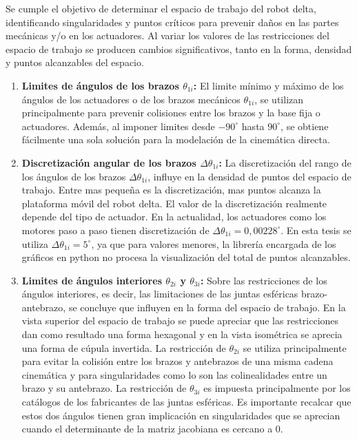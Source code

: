 \begin{itemize}
{            Se cumple el objetivo de determinar el espacio de trabajo del robot delta, identificando singularidades y puntos críticos  para prevenir daños en las partes mecánicas y/o en los actuadores. Al variar los valores de las restricciones del espacio de trabajo se producen cambios significativos, tanto en la forma, densidad y puntos alcanzables del espacio.
                \begin{enumerate}
                    \item  {\textbf{Limites de ángulos de los brazos  $\theta_{1i}$:  }El limite mínimo y máximo de los ángulos de los actuadores o de los brazos mecánicos $\theta_{1i}$, se utilizan principalmente para prevenir colisiones entre los brazos y la base fija o actuadores. Además, al imponer limites desde ${-90}^\circ$ hasta ${90}^\circ$, se obtiene fácilmente una sola solución para la modelación de la cinemática directa.}
                    \item {\textbf{Discretización angular de los brazos  $\Delta\theta_{1i}$:  }La discretización del rango de los ángulos de los brazos $\Delta\theta_{1i}$, influye en la densidad de puntos del espacio de trabajo. Entre mas pequeña es la discretización, mas puntos alcanza la plataforma móvil del robot delta. El valor de la discretización realmente depende del tipo de actuador. En la actualidad, los actuadores como los motores paso a paso tienen discretización  de ${\Delta\theta}_{1i}={0,00228}^{\circ}$. En esta tesis se utiliza  ${\Delta\theta}_{1i}={5}^{\circ}$, ya que para valores menores, la librería encargada de los gráficos en python no procesa la visualización del total de puntos alcanzables.} 
                    \item{\textbf{Limites de ángulos interiores $\theta_{2i}$ y $\theta_{3i}$:  }Sobre las restricciones de los ángulos interiores, es decir, las limitaciones de las juntas esféricas brazo-antebrazo, se concluye que influyen en la forma del espacio de trabajo. En la vista superior del espacio de trabajo se puede apreciar que las restricciones dan como resultado una forma hexagonal y en la vista isométrica se aprecia una forma de cúpula invertida. La restricción de $\theta_{2i}$ se utiliza principalmente para evitar la colisión entre los brazos y antebrazos de una misma cadena cinemática y para singularidades como lo son las colinealidades entre un brazo y su antebrazo. La restricción de $\theta_{3i}$ es impuesta principalmente por los catálogos de los fabricantes de las juntas esféricas.  Es importante recalcar que estos dos ángulos tienen gran implicación en singularidades que se aprecian cuando el determinante de la matriz jacobiana es cercano a 0.}

\end{enumerate}}
\end{itemize}
